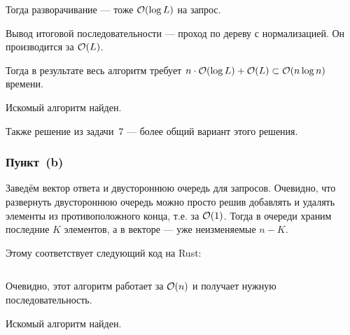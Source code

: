 Тогда разворачивание --- тоже $\mathcal{O}(\log L)$ на запрос.

Вывод итоговой последовательности --- проход по дереву с нормализацией.
Он производится за $\mathcal{O}(L)$.

Тогда в результате весь алгоритм требует $n \cdot \mathcal{O}(\log L) + \mathcal{O}(L) \subset \mathcal{O}(n \log n)$
времени.

Искомый алгоритм найден.

Также решение из задачи~7 --- более общий вариант этого решения.

\subsubsection{Пункт~(b)}
Заведём вектор ответа и двустороннюю очередь для запросов.
Очевидно, что развернуть двустороннюю очередь можно просто решив добавлять и удалять
элементы из противоположного конца, т.е. за $\mathcal{O}(1)$.
Тогда в очереди храним последние $K$ элементов, а в векторе --- уже неизменяемые $n - K$.

Этому соответствует следующий код на Rust:
\inputminted[firstline=5]{rust}{code/src/task04/mod.rs}

Очевидно, этот алгоритм работает за $\mathcal{O}(n)$ и получает нужную последовательность.

Искомый алгоритм найден.
